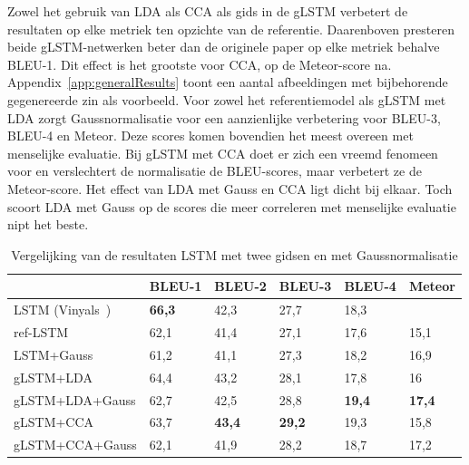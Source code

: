 Zowel het gebruik van LDA als CCA als gids in de gLSTM verbetert de resultaten op elke metriek ten opzichte van de referentie. Daarenboven presteren beide gLSTM-netwerken beter dan de originele paper op elke metriek behalve BLEU-1. Dit effect is het grootste voor CCA, op de Meteor-score na. Appendix~\ref{app:generalResults} toont een aantal afbeeldingen met bijbehorende gegenereerde zin als voorbeeld. Voor zowel het referentiemodel als gLSTM met LDA zorgt Gaussnormalisatie voor een aanzienlijke verbetering voor BLEU-3, BLEU-4 en Meteor. Deze scores komen bovendien het meest overeen met menselijke evaluatie. Bij gLSTM met CCA doet er zich een vreemd fenomeen voor en verslechtert de normalisatie de BLEU-scores, maar verbetert ze de Meteor-score. 
Het effect van LDA met Gauss en CCA ligt dicht bij elkaar. Toch scoort LDA met Gauss op de scores die meer correleren met menselijke evaluatie nipt het beste.
    \begin{table}
    	\centering
    	\begin{tabular}{llllll}
    		~                   & BLEU-1 & BLEU-2 & BLEU-3 & BLEU-4 & Meteor \\ \hline
    		LSTM (Vinyals~\cite{Google})      & \textbf{66,3}   & 42,3   & 27,7   & 18,3   & ~     \\ 
    		ref-LSTM         & 62,1   & 41,4   & 27,1   & 17,6   & 15,1  \\
    		LSTM+Gauss        & 61,2   & 41,1   & 27,3   & 18,2   & 16,9  \\
    		gLSTM+LDA         & 64,4   & 43,2   & 28,1   & 17,8   & 16  \\
    		gLSTM+LDA+Gauss & 62,7   & 42,5   & 28,8   & \textbf{19,4}   & \textbf{17,4}  \\
	        gLSTM+CCA         & 63,7   & \textbf{43,4}   & \textbf{29,2}   &19,3   & 15,8  \\
	        gLSTM+CCA+Gauss & 62,1   & 41,9   & 28,2   & 18,7   & 17,2  \\\hline
    	\end{tabular}
   	\caption{Vergelijking van de resultaten LSTM met twee gidsen en met Gaussnormalisatie}	
   	\label{table:lstm_results}
    \end{table}

